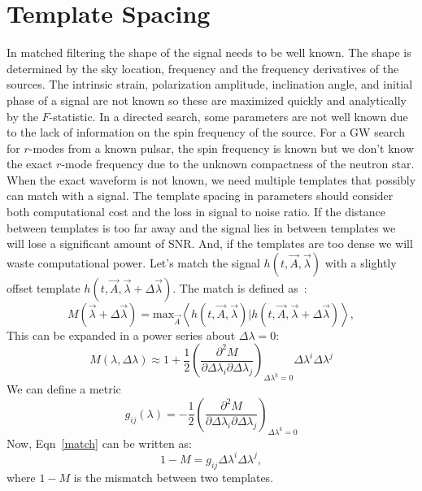 \documentclass{ttuthes2007}
\begin{document}
\section{Template Spacing}
In matched filtering the shape of the signal needs to be well known. The shape
is
determined by the sky location, frequency and the frequency derivatives of the
sources. The intrinsic strain, polarization amplitude, inclination angle, and
initial phase of a signal are not known so these are maximized quickly and
analytically by the $F$-statistic. In a
directed search, some parameters are not well known due to the lack of
information on the spin frequency of the source. For a \ac{GW} search for
$r$-modes
from a known pulsar, the spin frequency is known but we don't know the exact
$r$-mode frequency due to the unknown compactness of the neutron star. When the
exact waveform is not known, we need multiple templates that possibly can
match with a signal. The template spacing in parameters should consider both computational
cost and the loss in signal to noise ratio. If the distance between templates is
too far away
and the signal lies in between templates we will lose a significant amount of
\ac{SNR}. And, if the templates are too dense we will waste computational
power.  Let's match the signal $h(t,\vec{A},\vec{\lambda})$ with a slightly offset template
 $h(t,\vec{A},\vec{\lambda}+\Delta\vec{\lambda})$. The match is defined
as~\cite{Owen_1996}:
\begin{equation}
M(\vec{\lambda}+\Delta\vec{\lambda}) =
\mathrm{max}_{\vec{A}}\left\langle
h(t,\vec{A},\vec{\lambda})|h(t,\vec{A},\vec{\lambda}+\Delta\vec{\lambda})\right\rangle,
\end{equation}
This can be expanded in a power series about $\Delta\lambda=0$:
\begin{equation}\label{match}
M(\lambda,\Delta\lambda)\approx
1+\frac{1}{2}\left(\frac{\partial^2M}{\partial\Delta\lambda_i\partial\Delta\lambda_j}\right)_{\Delta\lambda^k=0}
\Delta\lambda^i\Delta\lambda^j
\end{equation}
We can define a metric 
\begin{equation}
g_{ij}(\lambda)=-\frac{1}{2}\left(\frac{\partial^2M}{\partial\Delta\lambda_i\partial\Delta\lambda_j}\right)_{\Delta\lambda^k=0}
\end{equation}
Now, Eqn~\ref{match} can be written as:
\begin{equation}
1-M=g_{ij} \Delta\lambda^i\Delta\lambda^j,
\end{equation}
where $1-M$ is the mismatch between two templates.
\end{document}
